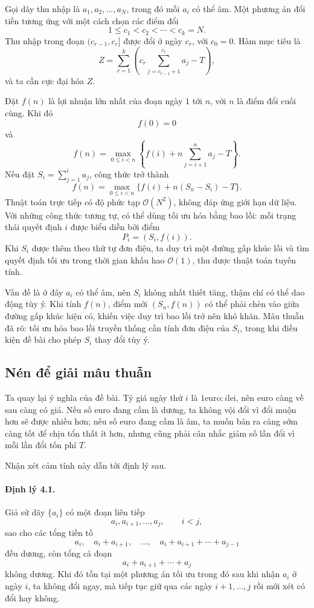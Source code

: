 \documentclass[11pt]{article}
\newcommand{\Oh}{\mathcal{O}}
\newcommand{\lei}{\ensuremath{\mathrm{lei}}}
\newcommand{\euro}{\ensuremath{\mathrm{euro}}}
\begin{document}
Gọi dãy thu nhập là $a_1,a_2,\ldots,a_N$, trong đó mỗi $a_i$ có thể âm. Một
phương án đổi tiền tương ứng với một cách chọn các điểm đổi
\[
  1\le c_1<c_2<\cdots<c_k=N.
\]
Thu nhập trong đoạn $(c_{r-1},c_r]$ được đổi ở ngày $c_r$, với $c_0=0$. Hàm
mục tiêu là
\[
  Z=\sum_{r=1}^{k}\left(c_r\sum_{j=c_{r-1}+1}^{c_r}a_j-T\right),
\]
và ta cần cực đại hóa $Z$.

Đặt $f(n)$ là lợi nhuận lớn nhất của đoạn ngày $1$ tới $n$, với $n$ là điểm
đổi cuối cùng. Khi đó
\[
  f(0)=0
\]
và
\[
  f(n)=\max_{0\le i<n}\left\{
    f(i)+n\sum_{j=i+1}^{n}a_j-T
  \right\}.
\]
Nếu đặt $S_i=\sum_{j=1}^{i}a_j$, công thức trở thành
\[
  f(n)=\max_{0\le i<n}\{f(i)+n(S_n-S_i)-T\}.
\]
Thuật toán trực tiếp có độ phức tạp $\Oh(N^2)$, không đáp ứng giới hạn dữ
liệu. Với những công thức tương tự, có thể dùng tối ưu hóa bằng bao lồi: mỗi
trạng thái quyết định $i$ được biểu diễn bởi điểm
\[
  P_i=(S_i,f(i)).
\]
Khi $S_i$ được thêm theo thứ tự đơn điệu, ta duy trì một đường gấp khúc lồi và
tìm quyết định tối ưu trong thời gian khấu hao $\Oh(1)$, thu được thuật toán
tuyến tính.

Vấn đề là ở đây $a_i$ có thể âm, nên $S_i$ không nhất thiết tăng, thậm chí có
thể dao động tùy ý. Khi tính $f(n)$, điểm mới $(S_n,f(n))$ có thể phải chèn
vào giữa đường gấp khúc hiện có, khiến việc duy trì bao lồi trở nên khó khăn.
Mâu thuẫn đã rõ: tối ưu hóa bao lồi truyền thống cần tính đơn điệu của $S_i$,
trong khi điều kiện đề bài cho phép $S_i$ thay đổi tùy ý.

\subsection{Nén để giải mâu thuẫn}

Ta quay lại ý nghĩa của đề bài. Tỷ giá ngày thứ $i$ là $1\euro:i\lei$, nên
euro càng về sau càng có giá. Nếu số euro đang cầm là dương, ta không vội đổi
vì đổi muộn hơn sẽ được nhiều hơn; nếu số euro đang cầm là âm, ta muốn bán ra
càng sớm càng tốt để chịu tổn thất ít hơn, nhưng cũng phải cân nhắc giảm số
lần đổi vì mỗi lần đổi tốn phí $T$.

Nhận xét cảm tính này dẫn tới định lý sau.

\paragraph{Định lý 4.1.}
Giả sử dãy $\{a_i\}$ có một đoạn liên tiếp
\[
  a_i,a_{i+1},\ldots,a_j,\qquad i<j,
\]
sao cho các tổng tiền tố
\[
  a_i,\quad a_i+a_{i+1},\quad \ldots,\quad
  a_i+a_{i+1}+\cdots+a_{j-1}
\]
đều dương, còn tổng cả đoạn
\[
  a_i+a_{i+1}+\cdots+a_j
\]
không dương. Khi đó tồn tại một phương án tối ưu trong đó sau khi nhận
$a_i$ ở ngày $i$, ta không đổi ngay, mà tiếp tục giữ qua các ngày
$i+1,\ldots,j$ rồi mới xét có đổi hay không.
\end{document}
